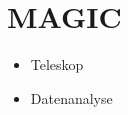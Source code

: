 \section{MAGIC}%
\label{sec:magic}

\begin{itemize}
  \item Teleskop
  \item Datenanalyse
\end{itemize}
